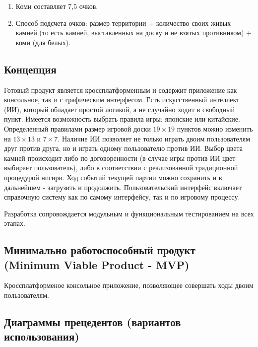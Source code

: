\begin{enumerate}

\item Коми составляет 7,5 очков.\\
\item Способ подсчета очков: размер территории + количество своих живых камней (то есть камней, выставленных на доску и не взятых противником) + коми (для белых).\\

\end{enumerate}
 
\subsection*{Концепция}

  Готовый продукт является кроссплатформенным и содержит приложение как консольное, так и с графическим интерфесом. Есть искусственный интеллект (ИИ), который обладает простой логикой, а не случайно ходит в свободный пункт. Имеется возможность выбрать правила игры: японские или китайские. Определенный правилами размер игровой доски $19 \times 19$ пунктов можно изменить на $13 \times 13$ и $7 \times 7$. Наличие ИИ позволяет не только играть двоим пользователям друг против друга, но и играть одному пользователю против ИИ. Выбор цвета камней происходит либо по договоренности (в случае игры против ИИ цвет выбирает пользователь), либо в соответствии с реализованной традиционной процедурой нигири. Ход событий текущей партии можно сохранить и в дальнейшем - загрузить и продолжить. Пользовательский интерфейс включает справочную систему как по самому интерфейсу, так и по игровому процессу.
  
  Разработка сопровождается модульным и функциональным тестированием на всех этапах.

\subsection*{Минимально работоспособный продукт (Minimum Viable Product - MVP)}

 Кроссплатформеное консольное приложение, позволяющее совершать ходы двоим пользователям.
  
\subsection*{Диаграммы прецедентов (вариантов использования)}


